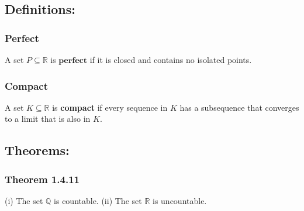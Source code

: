 \documentclass{article}
\begin{document}
\subsection*{\textbf{Definitions:}}
\subsubsection*{Perfect}
A set $P \subseteq \mathbb{R}$ is $\textbf{perfect}$ if it is closed and contains no isolated points.
\subsubsection*{Compact}
A set $K \subseteq \mathbb{R}$ is \textbf{compact} if every sequence in $K$ has a subsequence that converges to a limit that is also in $K$.

\subsection*{\textbf{Theorems:}}
\subsubsection*{Theorem 1.4.11}
(i) The set $\mathbb{Q}$ is countable. (ii) The set $\mathbb{R}$ is uncountable.
\end{document}
